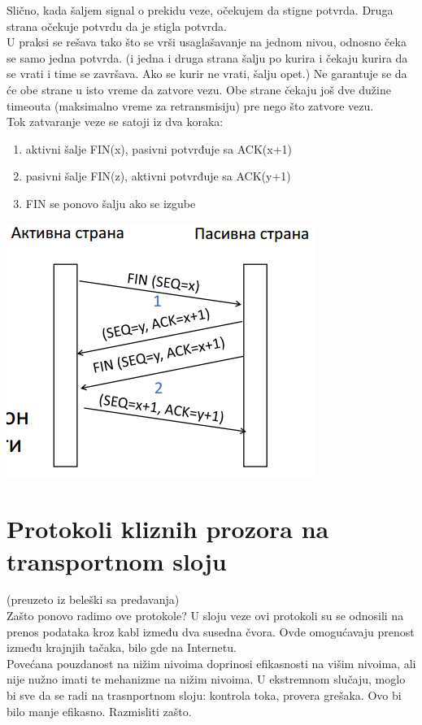 \documentclass{article} %
\begin{document}
Slično, kada šaljem signal o prekidu veze, očekujem da stigne potvrda. Druga strana očekuje potvrdu da je stigla potvrda. \\
U praksi se rešava tako što se vrši usaglašavanje na jednom nivou, odnosno čeka se samo jedna potvrda. (i jedna i druga strana šalju po kurira i čekaju kurira da se vrati i time se završava. Ako se kurir ne vrati, šalju opet.) Ne garantuje se da će obe strane u isto vreme da zatvore vezu. Obe strane čekaju još dve dužine timeouta (maksimalno vreme za retransmisiju) pre nego što zatvore vezu.\\
Tok zatvaranje veze se satoji iz dva koraka:
\begin{enumerate}
	\item aktivni šalje FIN(x), pasivni potvrđuje sa ACK(x+1)
	\item pasivni šalje FIN(z), aktivni potvrđuje sa ACK(y+1)
	\item FIN se ponovo šalju ako se izgube
\end{enumerate}
\begin{center}
	\includegraphics[scale=0.5]{veza5}
\end{center}
\section{Protokoli kliznih prozora na transportnom sloju}
(preuzeto iz beleški sa predavanja)\\

Zašto ponovo radimo ove protokole? U sloju veze ovi protokoli su se odnosili na prenos podataka kroz kabl između dva susedna čvora. Ovde omogućavaju prenost između krajnjih tačaka, bilo gde na Internetu.\\
 Povećana pouzdanost na nižim nivoima doprinosi efikasnosti na višim nivoima, ali nije nužno imati te mehanizme na nižim nivoima. U ekstremnom slučaju, moglo bi sve da se radi na trasnportnom sloju: kontrola toka, provera grešaka. Ovo bi bilo manje efikasno. Razmisliti zašto.\\
 
\end{document}
